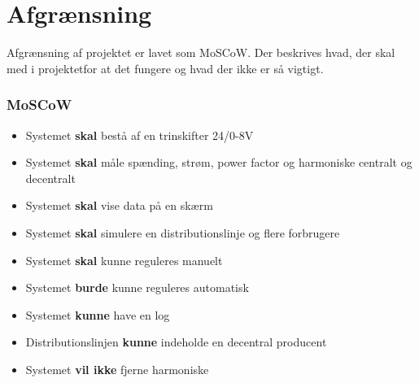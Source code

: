 

\section{Afgrænsning}
Afgrænsning af projektet er lavet som MoSCoW. Der beskrives hvad, der skal med i projektetfor at det fungere og hvad der ikke er så vigtigt.
\subsubsection{MoSCoW}

\begin{itemize}
	\item{Systemet \textbf{skal} bestå af en trinskifter 24/0-8V}
	\item{Systemet \textbf{skal} måle spænding, strøm, power factor og harmoniske centralt og decentralt}
	\item{Systemet \textbf{skal} vise data på en skærm}
	\item{Systemet \textbf{skal} simulere en distributionslinje og flere forbrugere}
	\item{Systemet \textbf{skal} kunne reguleres manuelt}
	\item{Systemet \textbf{burde} kunne reguleres automatisk}
	\item{Systemet \textbf{kunne} have en log}
	\item{Distributionslinjen \textbf{kunne} indeholde en decentral producent}
	\item{Systemet \textbf{vil ikke} fjerne harmoniske} 
\end{itemize}	